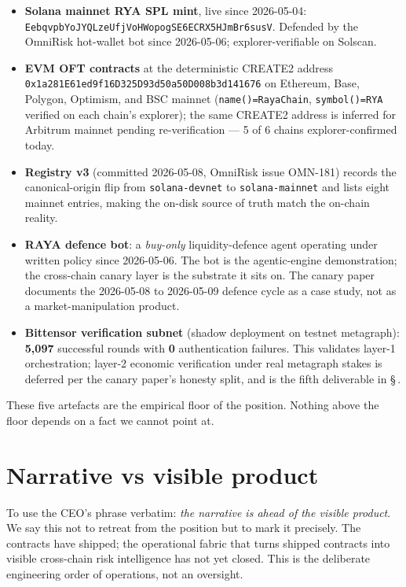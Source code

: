 \documentclass[11pt,a4paper]{article}
\begin{document}
\begin{itemize}
  \item \textbf{Solana mainnet RYA SPL mint}, live since 2026-05-04:%
    \\[0.15em]
    \mbox{\texttt{EebqvpbYoJYQLzeUfjVoHWopogSE6ECRX5HJmBr6susV}}.
    Defended by the OmniRisk hot-wallet bot since 2026-05-06;
    explorer-verifiable on Solscan.
  \item \textbf{EVM OFT contracts} at the deterministic CREATE2
    address%
    \\[0.15em]
    \mbox{\texttt{0x1a281E61ed9f16D325D93d50a50D008b3d141676}}
    on Ethereum, Base, Polygon, Optimism, and BSC mainnet
    (\texttt{name()=RayaChain}, \texttt{symbol()=RYA} verified on
    each chain's explorer); the same CREATE2 address is inferred for
    Arbitrum mainnet pending re-verification --- 5 of 6 chains
    explorer-confirmed today.
  \item \textbf{Registry v3} (committed 2026-05-08, OmniRisk
    issue OMN-181) records the canonical-origin flip from
    \texttt{solana-devnet} to \texttt{solana-mainnet} and lists eight
    mainnet entries, making the on-disk source of truth match the
    on-chain reality.
  \item \textbf{RAYA defence bot}: a \emph{buy-only}
    liquidity-defence agent operating under written policy since
    2026-05-06. The bot is the agentic-engine demonstration; the
    cross-chain canary layer is the substrate it sits on. The
    canary paper documents the 2026-05-08 to 2026-05-09 defence
    cycle as a case study, not as a market-manipulation product.
  \item \textbf{Bittensor verification subnet} (shadow deployment on
    testnet metagraph): \textbf{5{,}097} successful rounds with
    \textbf{0} authentication failures. This validates layer-1
    orchestration; layer-2 economic verification under real metagraph
    stakes is deferred per the canary paper's honesty split, and is
    the fifth deliverable in \S\,.
\end{itemize}

These five artefacts are the empirical floor of the position. Nothing
above the floor depends on a fact we cannot point at.

\section*{Narrative vs visible product}
\label{sec:gap}

To use the CEO's phrase verbatim: \emph{the narrative is ahead of the
visible product}. We say this not to retreat from the position but to
mark it precisely. The contracts have shipped; the operational fabric
that turns shipped contracts into visible cross-chain risk
intelligence has not yet closed. This is the deliberate engineering
order of operations, not an oversight.
\end{document}
